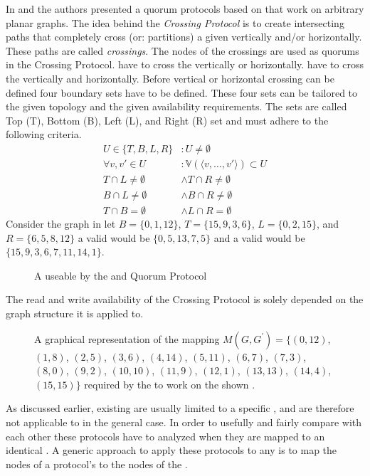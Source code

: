 \documentclass[conference]{IEEEtran}
\begin{document}
In \cite{RS13:NDS} and \cite{rt2015} the authors presented a quorum
protocols based on  that work on arbitrary planar graphs.
The idea behind the \emph{Crossing Protocol} is to create intersecting paths
that completely cross (or: partitions) a given  vertically and/or
horizontally. 
These paths are called \emph{crossings}.
The nodes of the crossings are used as quorums in the Crossing Protocol.
 have to cross the  vertically or horizontally. 
 have to cross the  vertically and horizontally. 
Before vertical or horizontal crossing can be defined four boundary sets have
to be defined.
These four sets can be tailored to the given topology and the given
availability requirements.
The sets are called Top (T), Bottom (B), Left (L), and Right (R) set and must
adhere to the following criteria.
\begin{align}
U \in \{T,B,L,R\} &: U \ne \emptyset \label{eq:tblr} \\
\forall v,v' \in U &: \mathbb{V}(\langle v, \dots, v' \rangle) \subset U\\
T \cap L \ne \emptyset &\land \label{eq:tcaplnotempty}
T \cap R \ne \emptyset \\
B \cap L \ne \emptyset &\land
B \cap R \ne \emptyset \\
T \cap B = \emptyset &\land
L \cap R = \emptyset \label{eq:bcaprnotempty}
\end{align}
Consider the graph in  let \(B = \{0,1,12\}\), \(T =
\{15,9,3,6\}\), \(L = \{0,2,15\}\), and \(R = \{6,5,8,12\}\) a valid 
would be \(\{0,5,13,7,5\}\) and a valid  would be
\(\{15,9,3,6,7,11,14,1\}\).
\begin{figure}
\centering
	
	\caption{A  useable by the  and
	 Quorum Protocol}
	\label{fig:crossing}
\end{figure}
The read and write availability of the Crossing Protocol is solely depended on
the graph structure it is applied to.

\begin{figure*}[t]
	\centering
	
\caption{A graphical representation of the mapping \(M(G,G^{'}) = \{(0,12)\), \((1,8)\), \((2,5)\), 
\((3,6)\), \((4,14)\), \((5,11)\), \((6,7)\), \((7,3)\), \((8,0)\), \((9,2)\), \((10,10)\), 
\((11,9)\), \((12,1)\), \((13,13)\), \((14,4)\), \((15,15)\}\) required by the
 to work on the shown .}
\label{fig:mapping}
\end{figure*}
As discussed earlier, existing  are usually limited
to a specific , and are therefore not applicable to  in the
general case.
In order to usefully and fairly compare  with each other these
protocols have to analyzed when they are mapped to an identical .
A generic approach to apply these protocols to any  is to map the
nodes of a protocol's  to the nodes of the .
\end{document}
